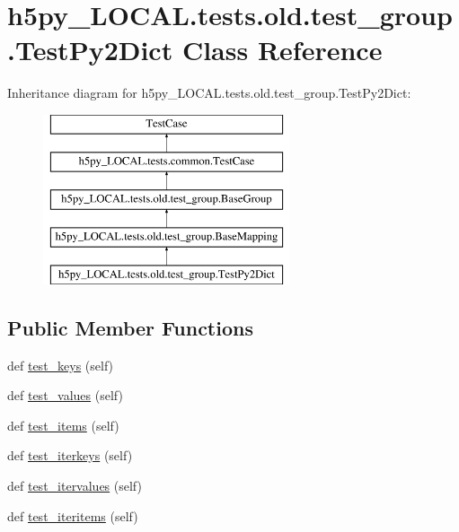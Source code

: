 \hypertarget{classh5py__LOCAL_1_1tests_1_1old_1_1test__group_1_1TestPy2Dict}{}\section{h5py\+\_\+\+L\+O\+C\+A\+L.\+tests.\+old.\+test\+\_\+group.\+Test\+Py2\+Dict Class Reference}
\label{classh5py__LOCAL_1_1tests_1_1old_1_1test__group_1_1TestPy2Dict}
Inheritance diagram for h5py\+\_\+\+L\+O\+C\+A\+L.\+tests.\+old.\+test\+\_\+group.\+Test\+Py2\+Dict\+:\begin{figure}[H]
\begin{center}
\leavevmode
\includegraphics[height=5.000000cm]{classh5py__LOCAL_1_1tests_1_1old_1_1test__group_1_1TestPy2Dict}
\end{center}
\end{figure}
\subsection*{Public Member Functions}
\begin{DoxyCompactItemize}
\item 
def \hyperlink{classh5py__LOCAL_1_1tests_1_1old_1_1test__group_1_1TestPy2Dict_a6ad65a643e60d43fa0d4f3f69f6f0031}{test\+\_\+keys} (self)
\item 
def \hyperlink{classh5py__LOCAL_1_1tests_1_1old_1_1test__group_1_1TestPy2Dict_a055343eedaf1a48259c7ad0e3bfce217}{test\+\_\+values} (self)
\item 
def \hyperlink{classh5py__LOCAL_1_1tests_1_1old_1_1test__group_1_1TestPy2Dict_aff0721b3ab832553f4d8a94540d4b7bc}{test\+\_\+items} (self)
\item 
def \hyperlink{classh5py__LOCAL_1_1tests_1_1old_1_1test__group_1_1TestPy2Dict_ad0d2d2813523ff0ce6121cfb572886f0}{test\+\_\+iterkeys} (self)
\item 
def \hyperlink{classh5py__LOCAL_1_1tests_1_1old_1_1test__group_1_1TestPy2Dict_a79d34c5e4d9044ab2b472ee1c5be84e7}{test\+\_\+itervalues} (self)
\item 
def \hyperlink{classh5py__LOCAL_1_1tests_1_1old_1_1test__group_1_1TestPy2Dict_a617508e9ebe6658de0acd244a97549bf}{test\+\_\+iteritems} (self)
\end{DoxyCompactItemize}

